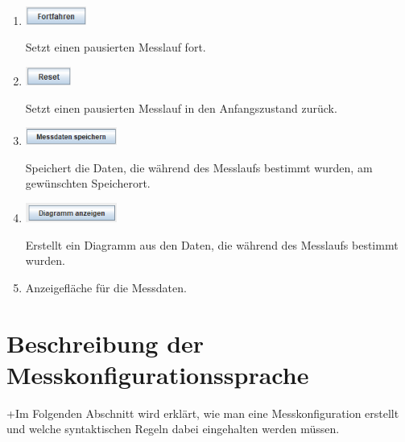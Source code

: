 \documentclass[parskip=full]{scrartcl}
\begin{document}
\begin{enumerate}
    \item
    \begin{flushleft}
        \includegraphics[width = 2cm]{Grafiken/10-Fortfahren.png}
    \end{flushleft}
    Setzt einen pausierten Messlauf fort.
    
    \item
    \begin{flushleft}
        \includegraphics[width = 1.5cm]{Grafiken/11-Reset.png}
    \end{flushleft}
    Setzt einen pausierten Messlauf in den Anfangszustand zurück.
    
    \item
    \begin{flushleft}
        \includegraphics[width = 3cm]{Grafiken/12-Messdaten_speichern.png}
    \end{flushleft}
    Speichert die Daten, die während des Messlaufs bestimmt wurden, am gewünschten Speicherort.
    
    \item
    \begin{flushleft}
        \includegraphics[width = 3cm]{Grafiken/13-Diagramm_anzeigen.png}
    \end{flushleft}
    Erstellt ein Diagramm aus den Daten, die während des Messlaufs bestimmt wurden.
    
    \item Anzeigefläche für die Messdaten.
    
\end{enumerate}



\section{Beschreibung der Messkonfigurationssprache}


+Im Folgenden Abschnitt wird erklärt, wie man eine Messkonfiguration erstellt und welche syntaktischen Regeln dabei eingehalten werden müssen.  
\end{document}
